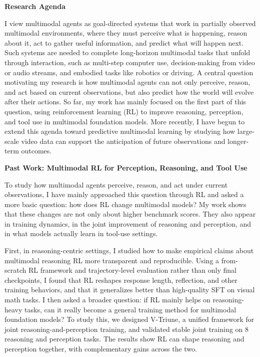 \documentclass[10pt,letterpaper]{article}
\newcommand{\statementsection}[1]{%
  \vspace{0.15em}%
  {\normalsize\bfseries #1\par}%
  \vspace{0.15em}%
}
\begin{document}

\normalsize

\statementsection{Research Agenda}

I view multimodal agents as goal-directed systems that work in partially observed multimodal environments, where they must perceive what is happening, reason about it, act to gather useful information, and predict what will happen next. Such systems are needed to complete long-horizon multimodal tasks that unfold through interaction, such as multi-step computer use, decision-making from video or audio streams, and embodied tasks like robotics or driving.
%
A central question motivating my research is how multimodal agents can not only perceive, reason, and act based on current observations, but also predict how the world will evolve after their actions. So far, my work has mainly focused on the first part of this question, using reinforcement learning (RL) to improve reasoning, perception, and tool use in multimodal foundation models. More recently, I have begun to extend this agenda toward predictive multimodal learning by studying how large-scale video data can support the anticipation of future observations and longer-term outcomes.

\statementsection{Past Work: Multimodal RL for Perception, Reasoning, and Tool Use}

To study how multimodal agents perceive, reason, and act under current observations, I have mainly approached this question through RL and asked a more basic question: how does RL change multimodal models? My work shows that these changes are not only about higher benchmark scores. They also appear in training dynamics, in the joint improvement of reasoning and perception, and in what models actually learn in tool-use settings.

First, in reasoning-centric settings, I studied how to make empirical claims about multimodal reasoning RL more transparent and reproducible. Using a from-scratch RL framework and trajectory-level evaluation rather than only final checkpoints, I found that RL reshapes response length, reflection, and other training behaviors, and that it generalizes better than high-quality SFT on visual math tasks. I then asked a broader question: if RL mainly helps on reasoning-heavy tasks, can it really become a general training method for multimodal foundation models? To study this, we designed V-Triune, a unified framework for joint reasoning-and-perception training, and validated stable joint training on 8 reasoning and perception tasks. The results show RL can shape reasoning and perception together, with complementary gains across the two.
\end{document}
